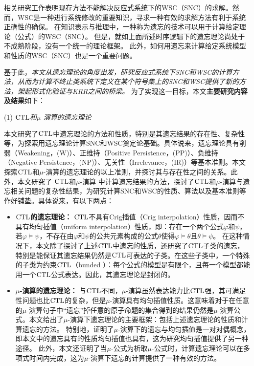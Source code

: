相关研究工作表明现存方法不能解决反应式系统下的WSC（SNC）的求解。然而，WSC是一种进行系统修改的重要知识，寻求一种有效的求解方法有利于系统正确性的确保。
在知识表示与推理中，一种称为遗忘的技术可以用于计算给定理论（公式）的WSC（SNC）。
但是，就如上面所述时序逻辑下的遗忘理论尚处于不成熟阶段，没有一个统一的理论框架。
此外，如何用遗忘来计算给定系统模型和性质的WSC（SNC）也是一个重要问题。

基于此，{\em 本文从遗忘理论的角度出发，研究反应式系统下SNC和WSC的计算方法，从而为计算不终止类系统下定义在某个符号集上的SNC和WSC提供了新的方法，架起形式化验证与KRR之间的桥梁。}
为了实现这一目标，本文\textbf{主要研究内容及结果}如下：

(1) {\em $\textrm{CTL}$和$\mu$-演算的遗忘理论}

本文研究了$\textrm{CTL}$中遗忘理论的方法和性质，特别是其遗忘结果的存在性、复杂性等，为探索用遗忘理论计算SNC和WSC奠定论基础。具体说来，遗忘理论具有削弱（Weakening，(W)）、正维持（Positive Persistence，(PP)）、负维持（Negative Persistence，(NP)）、无关性（Irrelevance，(IR)）等基本准则\cite{Yan:AIJ:2009}。本文探索$\textrm{CTL}$和$\mu$-演算的遗忘理论的以上准则，并探讨其与存在性之间的关系。此外，本文研究了 $\textrm{CTL}$和$\mu$-演算 中计算遗忘结果的方法，探讨了$\textrm{CTL}$和$\mu$-演算与遗忘相关问题的复杂性结果，为研究计算SNC和WSC的性质、算法以及基本准则等作好铺垫。具体说来，有以下两点：
\begin{itemize}
	\item \textbf{$\textrm{CTL}$的遗忘理论：}
	$\textrm{CTL}$不具有Crig插值（Crig interpolation）性质，因而不具有均匀插值（uniform interpolation）性质\cite{Maksimova:JANCL:1991}，即：存在一个两个公式$\varphi$和$\psi$，若$\varphi \models \psi$，不存在由$\varphi$和$\psi$的公共元素构成的公式$\theta$使得$\varphi \models \theta$且$\theta \models \psi$。
	在这种情况下，本文除了探讨了上述$\textrm{CTL}$中遗忘的性质，还研究了$\textrm{CTL}$子类的遗忘，特别是能保证其遗忘结果仍然是$\textrm{CTL}$可表达的子类。在这些子类中，一个特殊的子类为约束$\textrm{CTL}$（bunded \CTL）：每个公式的模型是有限个，且每一个模型都能用一个$\textrm{CTL}$公式表达。因此，其遗忘理论是封闭的。
	
	\item \textbf{$\mu$-演算的遗忘理论：}
	与$\textrm{CTL}$不同，$\mu$-演算虽然表达能力比$\textrm{CTL}$强，其可满足性问题也比$\textrm{CTL}$的复杂，但是$\mu$-演算具有均匀插值性质\cite{d2006modal}。这意味着对于在任意的$\mu$-演算句子中“遗忘”掉任意的原子命题的集合得到的结果仍然是$\mu$-演算公式。本文给出了$\mu$-演算下遗忘理论的主要框架：包括上述遗忘理论的性质和计算遗忘的方法。
	特别地，证明了$\mu$-演算下的遗忘与均匀插值是一对对偶概念，即本文中的遗忘具有的性质均匀插值也具有，这为研究均匀插值提供了另一种途径。
	此外，本文还证明了当$\mu$-公式为析取$\mu$-公式时，计算遗忘理论可以在多项式时间内完成，这为$\mu$-演算下遗忘的计算提供了一种有效的方法。
\end{itemize}


